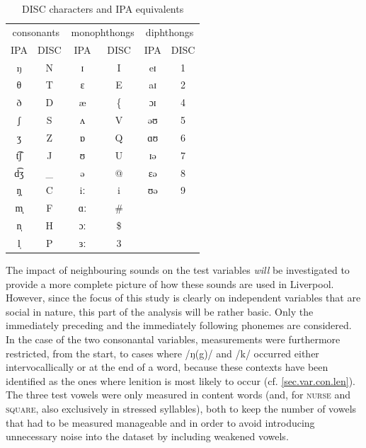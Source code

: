 	\begin{table}[h]
		\centering
		\caption{DISC characters and IPA equivalents}
		\begin{tabular}{cccccc}
			\hline
			\multicolumn{2}{c}{consonants} & \multicolumn{2}{c}{monophthongs} & \multicolumn{2}{c}{diphthongs}\\
			IPA & DISC & IPA & DISC & IPA & DISC\\
			\hline
			ŋ & N & ɪ & I & eɪ & 1\\
			θ & T & ɛ & E & aɪ & 2\\
			ð & D & æ & \{ & ɔɪ & 4\\
			ʃ & S & ʌ & V & əʊ & 5\\
			ʒ & Z & ɒ & Q & ɑʊ & 6\\
			t͡ʃ & J & ʊ & U & ɪə & 7\\
			d͡ʒ & \_ & ə & @ & ɛə & 8\\
			ŋ̩ & C & iː & i & ʊə & 9\\
			m̩̩ & F & ɑː & \# &&\\
			n̩ & H & ɔː & \$ &&\\
			l̩ & P & ɜː & 3 &&\\
			\hline
		\end{tabular}
		\label{tab.DISC}
	\end{table}

The impact of neighbouring sounds on the test variables \emph{will} be investigated to provide a more complete picture of how these sounds are used in Liverpool.
However, since the focus of this study is clearly on independent variables that are social in nature, this part of the analysis will be rather basic.
Only the immediately preceding and the immediately following phonemes are considered.
In the case of the two consonantal variables, measurements were furthermore restricted, from the start, to cases where /ŋ(g)/ and /k/ occurred either intervocallically or at the end of a word, because these contexts have been identified as the ones where lenition is most likely to occur (cf. \ref{sec.var.con.len}).
The three test vowels were only measured in content words (and, for \textsc{nurse} and \textsc{square}, also exclusively in stressed syllables), both to keep the number of vowels that had to be measured manageable and in order to avoid introducing unnecessary noise into the dataset by including weakened vowels.

